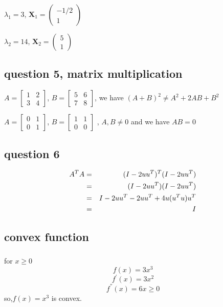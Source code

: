 \documentclass[english,11pt]{article}
\begin{document}
$\lambda_{1}=3$, $\boldsymbol{X}_{1}=\left(\begin{array}{c}
-1/2\\
1
\end{array}\right)$

$\lambda_{2}=14$, $\boldsymbol{X}_{2}=\left(\begin{array}{c}
5\\
1
\end{array}\right)$

\subsection{question 5, matrix multiplication}

$A=\left[\begin{array}{cc}
1 & 2\\
3 & 4
\end{array}\right]$, $B=\left[\begin{array}{cc}
5 & 6\\
7 & 8
\end{array}\right]$, we have $(A+B)^{2}\neq A^{2}+2AB+B^{2}$ 

$A=\left[\begin{array}{cc}
0 & 1\\
0 & 1
\end{array}\right]$, $B=\left[\begin{array}{cc}
1 & 1\\
0 & 0
\end{array}\right]$ , $A,B\neq0$ and we have $AB=0$

\subsection{question 6}

\begin{eqnarray}
A^{T}A & = & (I-2uu^{T})^{T}(I-2uu^{T}) \notag \\
 & = & (I-2uu^{T})(I-2uu^{T}) \notag \\
 & = & I-2uu^{T}-2uu^{T}+4u(u^{T}u)u^{T} \notag \\
 & = & I
\end{eqnarray}

\subsection{convex function}
\subsubsection{}
for $x\geq 0$
\begin{equation}
f(x)  =  3x^{3}
\end{equation}
\begin{equation}
f^{'}(x)  =  3x^{2} 
\end{equation}
\begin{equation}
f^{''}(x)  =  6x \geq 0
\end{equation}
so,$f(x)=x^{3}$ is convex.
\end{document}
